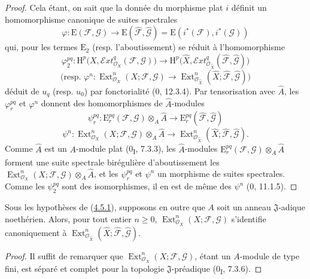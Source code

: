 \begin{proof}
Cela étant, on sait que la donnée du morphisme plat $i$ définit un
homomorphisme canonique de suites spectrales
\[
\varphi:\mathrm E(\mathcal F,\mathcal G)\longrightarrow
\mathrm E(\widehat{\mathcal F},\widehat{\mathcal G})
=\mathrm E(i^*(\mathcal F),i^*(\mathcal G))
\]
qui, pour les termes $\mathrm E_2$ (resp. l'aboutissement) se réduit à
l'homomorphisme
\[
\varphi_2^{pq}:\mathrm H^p\bigl(X,
\mathcal{E}\!xt^q_{\mathcal O_X}(\mathcal F,\mathcal G)\bigr)
\longrightarrow
\mathrm H^p\bigl(\widehat X,
\mathcal{E}\!xt^q_{\mathcal O_{\widehat X}}
(\widehat{\mathcal F},\widehat{\mathcal G})\bigr)
\]
\[
\text{(resp. }\varphi^n:\operatorname{Ext}^n_{\mathcal O_X}
(X;\mathcal F,\mathcal G)\longrightarrow
\operatorname{Ext}^n_{\mathcal O_{\widehat X}}
(\widehat X;\widehat{\mathcal F},\widehat{\mathcal G})\text{)}
\]
déduit de $u_q$ (resp. $u_0$) par fonctorialité (0, 12.3.4). Par
tensorisation avec $\widehat A$, les $\varphi_r^{pq}$ et $\varphi^n$ donnent
des homomorphismes de $\widehat A$-modules
\[
\psi_r^{pq}:\mathrm E_r^{pq}(\mathcal F,\mathcal G)
\otimes_A\widehat A\longrightarrow
\mathrm E_r^{pq}(\widehat{\mathcal F},\widehat{\mathcal G})
\]
\[
\psi^n:\operatorname{Ext}^n_{\mathcal O_X}(X;\mathcal F,\mathcal G)
\otimes_A\widehat A\longrightarrow
\operatorname{Ext}^n_{\mathcal O_{\widehat X}}
(\widehat X;\widehat{\mathcal F},\widehat{\mathcal G}).
\]
Comme $\widehat A$ est un $A$-module plat (0\textsubscript{I}, 7.3.3), les
$\widehat A$-modules
$\mathrm E_r^{pq}(\mathcal F,\mathcal G)\otimes_A\widehat A$ forment une
suite spectrale birégulière d'aboutissement les
$\operatorname{Ext}^n_{\mathcal O_X}(X;\mathcal F,\mathcal G)\otimes_A\widehat A$, et les
$\psi_r^{pq}$ et $\psi^n$ un morphisme de suites spectrales. Comme les
$\psi_2^{pq}$ sont des isomorphismes, il en est de même des $\psi^n$
(0, 11.1.5).
\end{proof}

\begin{corollary}[4.5.2]
\label{III.4.5.2-fr}
Sous les hypothèses de (\hyperref[III.4.5.1-fr]{4.5.1}), supposons en outre
que $A$ soit un anneau $\mathfrak J$-adique noethérien. Alors, pour tout
entier $n\geq0$, $\operatorname{Ext}^n_{\mathcal O_X}(X;\mathcal F,\mathcal G)$
s'identifie canoniquement à
$\operatorname{Ext}^n_{\mathcal O_{\widehat X}}
(\widehat X;\widehat{\mathcal F},\widehat{\mathcal G})$.
\end{corollary}

\begin{proof}
Il suffit de remarquer que $\operatorname{Ext}^n_{\mathcal O_X}
(X;\mathcal F,\mathcal G)$, étant un $A$-module de type fini, est séparé et
complet pour la topologie $\mathfrak J$-préadique (0\textsubscript{I}, 7.3.6).
\end{proof}

